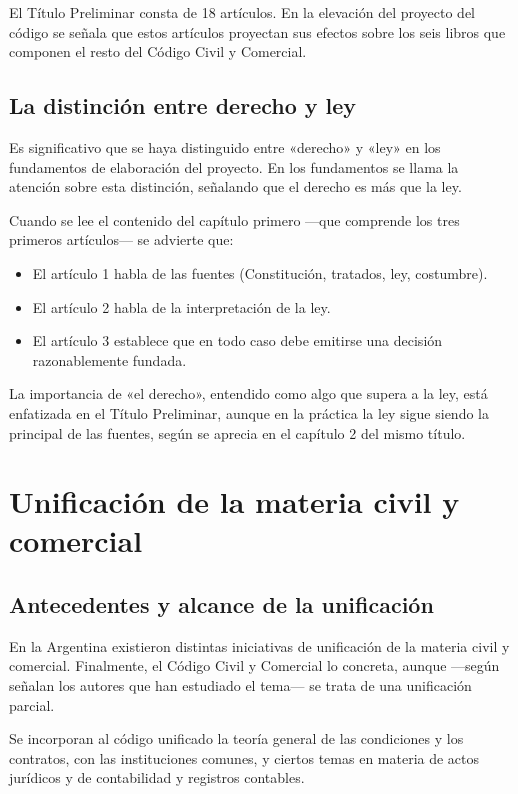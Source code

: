 \documentclass[12pt,oneside]{book}
\begin{document}
El Título Preliminar consta de 18 artículos. En la elevación del proyecto del código se señala que estos artículos proyectan sus efectos sobre los seis libros que componen el resto del Código Civil y Comercial.

\subsection{La distinción entre derecho y ley}

Es significativo que se haya distinguido entre «derecho» y «ley» en los fundamentos de elaboración del proyecto. En los fundamentos se llama la atención sobre esta distinción, señalando que el derecho es más que la ley.

Cuando se lee el contenido del capítulo primero —que comprende los tres primeros artículos— se advierte que:

\begin{itemize}
    \item El artículo 1 habla de las fuentes (Constitución, tratados, ley, costumbre).
    \item El artículo 2 habla de la interpretación de la ley.
    \item El artículo 3 establece que en todo caso debe emitirse una decisión razonablemente fundada.
\end{itemize}

La importancia de «el derecho», entendido como algo que supera a la ley, está enfatizada en el Título Preliminar, aunque en la práctica la ley sigue siendo la principal de las fuentes, según se aprecia en el capítulo 2 del mismo título.

\section{Unificación de la materia civil y comercial}

\subsection{Antecedentes y alcance de la unificación}

En la Argentina existieron distintas iniciativas de unificación de la materia civil y comercial. Finalmente, el Código Civil y Comercial lo concreta, aunque —según señalan los autores que han estudiado el tema— se trata de una unificación parcial.

Se incorporan al código unificado la teoría general de las condiciones y los contratos, con las instituciones comunes, y ciertos temas en materia de actos jurídicos y de contabilidad y registros contables.
\end{document}
